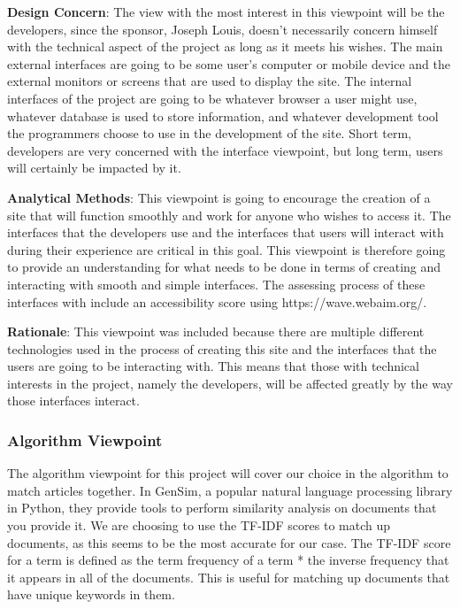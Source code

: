 \documentclass[onecolumn, draftclsnofoot,10pt, compsoc]{IEEEtran}
\begin{document}
\hangindent=0.5cm \textbf{Design Concern}:
The view with the most interest in this viewpoint will be the developers, since the sponsor, Joseph Louis, doesn't necessarily concern himself with the technical aspect of the project as long as it meets his wishes. The main external interfaces are going to be some user's computer or mobile device and the external monitors or screens that are used to display the site. The internal interfaces of the project are going to be whatever browser a user might use, whatever database is used to store information, and whatever development tool the programmers choose to use in the development of the site. Short term, developers are very concerned with the interface viewpoint, but long term, users will certainly be impacted by it. 

\hangindent=0.5cm \textbf{Analytical Methods}: This viewpoint is going to encourage the creation of a site that will function smoothly and work for anyone who wishes to access it. The interfaces that the developers use and the interfaces that users will interact with during their experience are critical in this goal. This viewpoint is therefore going to provide an understanding for what needs to be done in terms of creating and interacting with smooth and simple interfaces. The assessing process of these interfaces with include an accessibility score using https://wave.webaim.org/.

\hangindent=0.5cm \textbf{Rationale}: This viewpoint was included because there are multiple different technologies used in the process of creating this site and the interfaces that the users are going to be interacting with. This means that those with technical interests in the project, namely the developers, will be affected greatly by the way those interfaces interact. 

\subsubsection{Algorithm Viewpoint}
The algorithm viewpoint for this project will cover our choice in the algorithm to match articles together. In GenSim, a popular natural language processing library in Python, they provide tools to perform similarity analysis on documents that you provide it. We are choosing to use the TF-IDF scores to match up documents, as this seems to be the most accurate for our case. The TF-IDF score for a term is defined as the term frequency of a term * the inverse frequency that it appears in all of the documents. This is useful for matching up documents that have unique keywords in them.
\end{document}
